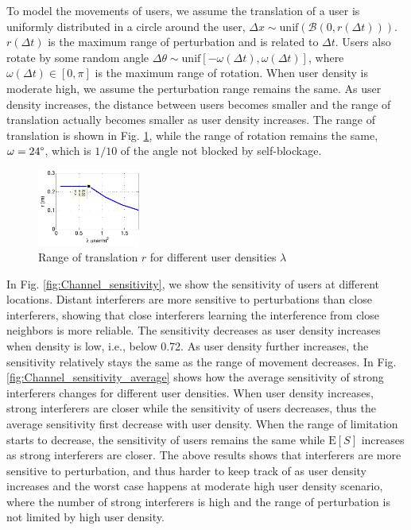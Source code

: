 \documentclass[10pt, conference, letterpaper]{IEEEtran}
\begin{document}
To model the movements of users, we assume the translation of a user is uniformly distributed in a circle around the user, $\Delta x \sim \mathrm{unif}(\mathcal{B}(0, r(\Delta t)))$. $r(\Delta t)$ is the maximum range of perturbation and is related to $\Delta t$. Users also rotate by some random angle $\Delta \theta \sim \mathrm{unif}[-\omega(\Delta t), \omega(\Delta t)]$, where $\omega(\Delta t)\in[0,\pi]$ is the maximum range of rotation. When user density is moderate high, we assume the perturbation range remains the same. As user density increases, the distance between users becomes smaller and the range of translation actually becomes smaller as user density increases. The range of translation is shown in Fig. \ref{fig:Channel_translation_range}, while the range of rotation remains the same, $\omega=24\degree$, which is $1/10$ of the angle not blocked by self-blockage.

\begin{figure}
	\centering
	\includegraphics[width = 0.3\textwidth]{Channel_translation_range.pdf}
	\caption{Range of translation $r$ for different user densities $\lambda$}
	\label{fig:Channel_translation_range}
\end{figure}

In Fig. \ref{fig:Channel_sensitivity}, we show the sensitivity of users at different locations. Distant interferers are more sensitive to perturbations than close interferers, showing that close interferers learning the interference from close neighbors is more reliable. The sensitivity decreases as user density increases when density is low, i.e., below 0.72. As user density further increases, the sensitivity relatively stays the same as the range of movement decreases. In Fig. \ref{fig:Channel_sensitivity_average} shows how the average sensitivity of strong interferers changes for different user densities. When user density increases, strong interferers are closer while the sensitivity of users decreases, thus the average sensitivity first decrease with user density. When the range of limitation starts to decrease, the sensitivity of users remains the same while $\mathrm{E}[S]$ increases as strong interferers are closer. The above results shows that interferers are more sensitive to perturbation, and thus harder to keep track of as user density increases and the worst case happens at moderate high user density scenario, where the number of strong interferers is high and the range of perturbation is not limited by high user density. 
\end{document}
